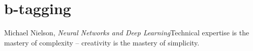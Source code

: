 \chapter{b-tagging}
\begin{chapquote}{Michael Nielson, \emph{Neural Networks and Deep Learning}}{Technical expertise is the mastery of complexity -- creativity is the mastery of simplicity.}
\end{chapquote}





\FloatBarrier
\clearpage


\FloatBarrier
\clearpage




\FloatBarrier
\clearpage


%
